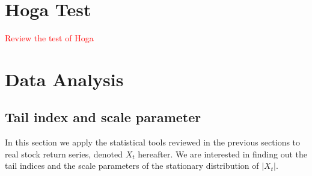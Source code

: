 \documentclass{article}
\begin{document}
\section{Hoga Test}

\textcolor{red}{Review the test of Hoga}

\section{Data Analysis}
\subsection{Tail index and scale parameter}
In this section we apply the statistical tools reviewed in the
previous sections to real stock return series, denoted $X_t$
hereafter. We are interested in finding out the tail indices and the
scale parameters of the stationary distribution of $|X_t|$.

\end{document}
